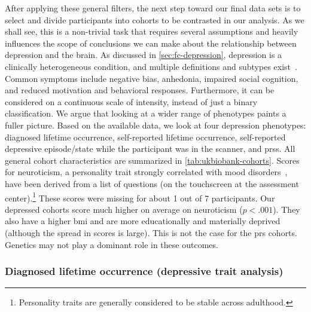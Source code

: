 After applying these general filters, the next step toward our final data sets is to select and divide participants into cohorts to be contrasted in our analysis.
As we shall see, this is a non-trivial task that requires several assumptions and heavily influences the scope of conclusions we can make about the relationship between depression and the brain.
As discussed in \cref{sec:fc-depression}, depression is a clinically heterogeneous condition, and multiple definitions and subtypes exist~\parencite[see also][]{Fried2022}.
Common symptoms include negative bias, anhedonia, impaired social cognition, and reduced motivation and behavioral responses.
Furthermore, it can be considered on a continuous scale of intensity, instead of just a binary classification.
We argue that looking at a wider range of phenotypes paints a fuller picture.
Based on the available data, we look at four depression phenotypes: diagnosed lifetime occurrence, self-reported lifetime occurrence, self-reported depressive episode/state while the participant was in the scanner, and \glspl{prs}.
All general cohort characteristics are summarized in \cref{tab:ukbiobank-cohorts}.
%
Scores for neuroticism, a personality trait strongly correlated with mood disorders~\parencite{Goldstein2014}, have been derived from a list of questions (on the touchscreen at the assessment center).\footnote{Personality traits are generally considered to be stable across adulthood.}
These scores were missing for about 1 out of 7 participants.
Our depressed cohorts score much higher on average on neuroticism ($p < .001$).
They also have a higher \gls{bmi} and are more educationally and materially deprived (although the spread in scores is large).
This is not the case for the \gls{prs} cohorts.
Genetics may not play a dominant role in these outcomes.



\subsubsection{Diagnosed lifetime occurrence (depressive trait analysis)}

